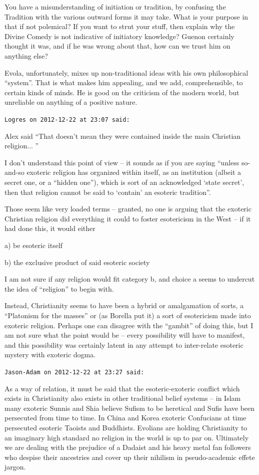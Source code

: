 \begin{footnotesize}
\begin{sffamily}
You have a misunderstanding of initiation or tradition, by confusing the Tradition with the various outward forms it may take. What is your purpose in that if not polemical? If you want to strut your stuff, then explain why the Divine Comedy is not indicative of initiatory knowledge? Guenon certainly thought it was, and if he was wrong about that, how can we trust him on anything else?

Evola, unfortunately, mixes up non-traditional ideas with his own philosophical ``system''. That is what makes him appealing, and we add, comprehensible, to certain kinds of minds. He is good on the criticism of the modern world, but unreliable on anything of a positive nature.

\hfill

\texttt{Logres on 2012-12-22 at 23:07 said:}

Alex said ``That doesn't mean they were contained inside the main Christian religion... ''

I don't understand this point of view -- it sounds as if you are saying ``unless so-and-so exoteric religion has organized within itself, as an institution (albeit a secret one, or a ``hidden one''), which is sort of an acknowledged `state secret', then that religion cannot be said to `contain' an esoteric tradition''.

Those seem like very loaded terms -- granted, no one is arguing that the exoteric Christian religion did everything it could to foster esotericism in the West -- if it had done this, it would either

a) be esoteric itself

b) the exclusive product of said esoteric society

I am not sure if any religion would fit category b, and choice a seems to undercut the idea of ``religion'' to begin with.

Instead, Christianity seems to have been a hybrid or amalgamation of sorts, a ``Platonism for the masses'' or (as Borella put it) a sort of esotericism made into exoteric religion. Perhaps one can disagree with the ``gambit'' of doing this, but I am not sure what the point would be -- every possibility will have to manifest, and this possibility was certainly latent in any attempt to inter-relate esoteric mystery with exoteric dogma.

\hfill

\texttt{Jason-Adam on 2012-12-22 at 23:27 said:}

As a way of relation, it must be said that the esoteric-exoteric conflict which exists in Christianity also exists in other traditional belief systems -- in Islam many exoteric Sunnis and Shia believe Sufism to be heretical and Sufis have been persecuted from time to time. In China and Korea exoteric Confucians at time persecuted esoteric Taoists and Buddhists. Evolians are holding Christianity to an imaginary high standard no religion in the world is up to par on. Ultimately we are dealing with the prejudice of a Dadaist and his heavy metal fan followers who despise their ancestries and cover up their nihilism in pseudo-academic effete jargon.


\end{sffamily}
\end{footnotesize}
